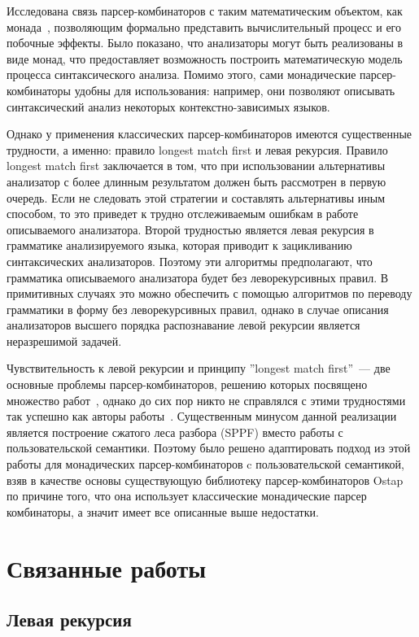 \documentclass[conference]{IEEEtran}
\begin{document}
Исследована связь парсер-комбинаторов с таким математическим объектом, как монада~\cite{meijer,wadler}, позволяющим формально представить вычислительный процесс и его побочные эффекты. Было показано, что анализаторы могут быть реализованы в виде монад, что предоставляет возможность построить математическую модель процесса синтаксического анализа. Помимо этого, сами монадические парсер-комбинаторы удобны для использования: например, они позволяют описывать синтаксический анализ некоторых контекстно-зависимых языков.

Однако у применения классических парсер-комбинаторов имеются существенные трудности, а именно: правило longest match first и левая рекурсия. Правило longest match first заключается в том, что при использовании альтернативы анализатор с более длинным результатом должен быть рассмотрен в первую очередь. Если не следовать этой стратегии и составлять альтернативы иным способом, то это приведет к трудно отслеживаемым ошибкам в работе описываемого анализатора. Второй трудностью является левая рекурсия в грамматике анализируемого языка, которая приводит к зацикливанию синтаксических анализаторов. Поэтому эти алгоритмы предполагают, что грамматика описываемого анализатора будет без леворекурсивных правил. В примитивных случаях это можно обеспечить с помощью алгоритмов по переводу грамматики в форму без леворекурсивных правил, однако в случае описания анализаторов высшего порядка распознавание левой рекурсии является неразрешимой задачей.

Чувствительность к левой рекурсии и принципу ''longest match first''~--- две основные проблемы парсер-комбинаторов, решению которых посвящено множество работ~\cite{frost,tratt,warth}, однако до сих пор никто не справлялся с этими трудностями так успешно как авторы работы~\cite{meerkat}. Существенным минусом данной реализации является построение сжатого леса разбора (SPPF) вместо работы с пользовательской семантики. Поэтому было решено адаптировать подход из этой работы для монадических парсер-комбинаторов c пользовательской семантикой, взяв в качестве основы существующую библиотеку парсер-комбинаторов Ostap~\cite{ostap} по причине того, что она использует классические монадические парсер комбинаторы, а значит имеет все описанные выше недостатки. 

\section{Связанные работы}

\subsection{Левая рекурсия}
\end{document}
